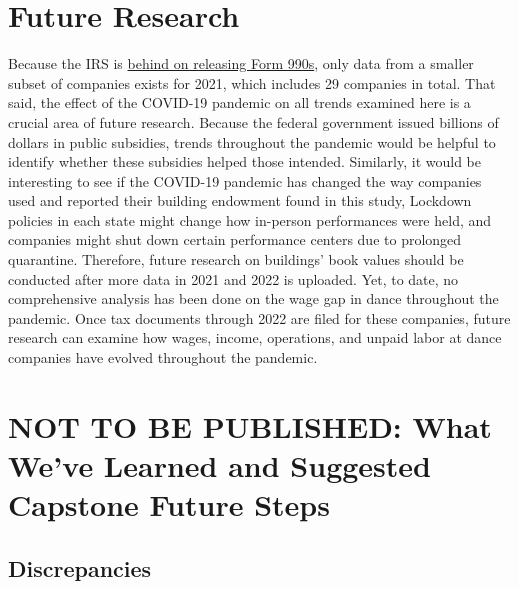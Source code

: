 \documentclass[Dance Data
Project,article,submit,moreauthors,pdftex]{mdpi}
\begin{document}
\hypertarget{future-research}{%
\section{Future Research}\label{future-research}}

Because the IRS is
\href{https://www.propublica.org/article/irs-hasnt-released-nearly-half-million-nonprofit-tax-records}{behind
on releasing Form 990s}, only data from a smaller subset of companies
exists for 2021, which includes 29 companies in total. That said, the
effect of the COVID-19 pandemic on all trends examined here is a crucial
area of future research. Because the federal government issued billions
of dollars in public subsidies, trends throughout the pandemic would be
helpful to identify whether these subsidies helped those intended.
Similarly, it would be interesting to see if the COVID-19 pandemic has
changed the way companies used and reported their building endowment
found in this study, Lockdown policies in each state might change how
in-person performances were held, and companies might shut down certain
performance centers due to prolonged quarantine. Therefore, future
research on buildings' book values should be conducted after more data
in 2021 and 2022 is uploaded. Yet, to date, no comprehensive analysis
has been done on the wage gap in dance throughout the pandemic. Once tax
documents through 2022 are filed for these companies, future research
can examine how wages, income, operations, and unpaid labor at dance
companies have evolved throughout the pandemic.

\hypertarget{not-to-be-published-what-weve-learned-and-suggested-capstone-future-steps}{%
\section{NOT TO BE PUBLISHED: What We've Learned and Suggested Capstone
Future
Steps}\label{not-to-be-published-what-weve-learned-and-suggested-capstone-future-steps}}

\hypertarget{discrepancies}{%
\subsection{Discrepancies}\label{discrepancies}}
\end{document}
